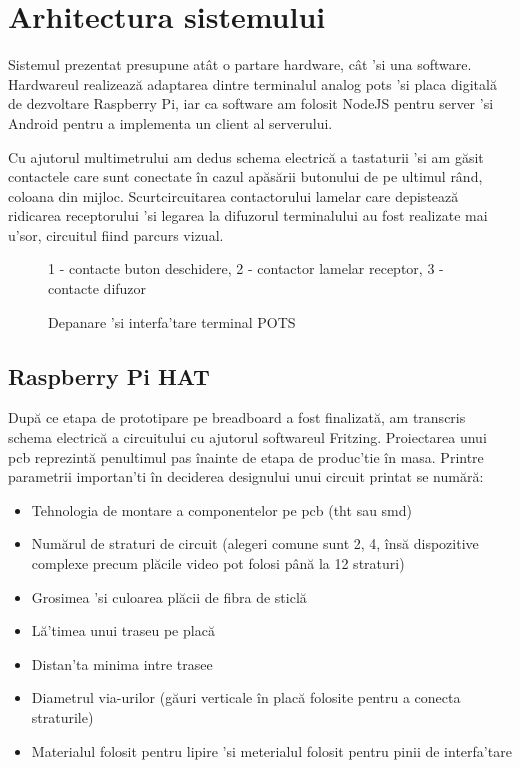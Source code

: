 \section {Arhitectura sistemului}

Sistemul prezentat presupune atât o partare hardware, cât 'si una software. Hardwareul realizează adaptarea dintre terminalul analog \acrshort{pots} 'si placa digitală de dezvoltare Raspberry Pi, iar ca software am folosit NodeJS pentru server 'si Android pentru a implementa un client al serverului.

Cu ajutorul multimetrului am dedus schema electrică a tastaturii 'si am găsit contactele care sunt conectate în cazul apăsării butonului de pe ultimul rând, coloana din mijloc. Scurtcircuitarea contactorului lamelar care depistează ridicarea receptorului 'si legarea la difuzorul terminalului au fost realizate mai u'sor, circuitul fiind parcurs vizual.

\begin{figure}[h!]
  \centering
  \caption{Depanare 'si interfa'tare terminal POTS}
  \medskip
  \small
  1 - contacte buton deschidere, 2 - contactor lamelar receptor, 3 - contacte difuzor
\end{figure}


\subsection {Raspberry Pi HAT}

După ce etapa de prototipare pe breadboard a fost finalizată, am transcris schema electrică a circuitului cu ajutorul softwareul Fritzing. Proiectarea unui 
\acrfull{pcb} reprezintă penultimul pas înainte de etapa de produc'tie în masa. Printre parametrii importan'ti în deciderea designului unui circuit printat se numără:

\begin{itemize}
  \item Tehnologia de montare a componentelor pe \acrshort{pcb} (\acrfull{tht} sau \acrfull{smd})
  \item Numărul de straturi de circuit (alegeri comune sunt 2, 4, însă dispozitive complexe precum plăcile video pot folosi până la 12 straturi)
  \item Grosimea 'si culoarea plăcii de fibra de sticlă
  \item Lă'timea unui traseu pe placă
  \item Distan'ta minima intre trasee
  \item Diametrul via-urilor (găuri verticale în placă folosite pentru a conecta straturile)
  \item Materialul folosit pentru lipire 'si meterialul folosit pentru pinii de interfa'tare
\end{itemize}

